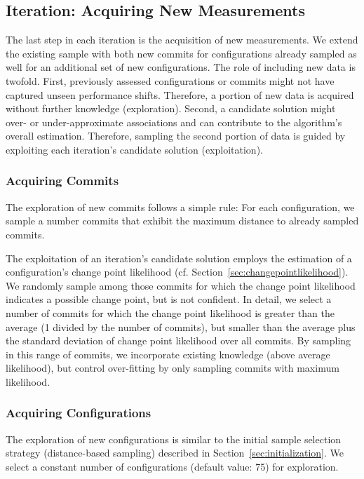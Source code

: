 \documentclass[sigconf, screen]{acmart}
\begin{document}
	\subsection{Iteration: Acquiring New Measurements}\label{sec:acquisition}
	The last step in each iteration is the acquisition of new measurements. We extend the existing sample with both new commits for configurations already sampled as well for an additional set of new configurations. The role of including new data is twofold. First, previously assessed configurations or commits might not have captured unseen performance shifts. Therefore, a portion of new data is acquired without further knowledge (exploration). Second, a candidate solution might over- or under-approximate associations and can contribute to the algorithm's overall estimation. Therefore, sampling the second portion of data is guided by exploiting each iteration's candidate solution (exploitation).
	
	\subsubsection{Acquiring Commits}
	The exploration of new commits follows a simple rule: For each configuration, we sample a number commits that exhibit the maximum distance to already sampled commits. 
	
	The exploitation of an iteration's candidate solution employs the estimation of a configuration's change point likelihood (cf. Section~\ref{sec:changepointlikelihood}). We randomly sample among those commits for which the change point likelihood indicates a possible change point, but is not confident. In detail, we select a number of commits for which the change point likelihood is greater than the average (1 divided by the number of commits), but smaller than the average plus the standard deviation of change point likelihood over all commits. By sampling in this range of commits, we incorporate existing knowledge (above average likelihood), but control over-fitting by only sampling commits with maximum likelihood.
	
	\subsubsection{Acquiring Configurations}
	The exploration of new configurations is similar to the initial sample selection strategy (distance-based sampling) described in Section~\ref{sec:initialization}. We select a constant number of configurations (default value: 75) for exploration. 
	
\end{document}
